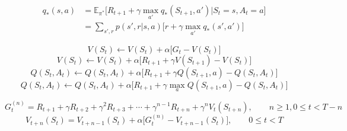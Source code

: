 \documentclass{article}
\begin{document}
\begin{align*}
  q_{\ast}(s,a) &= \mathbb{E}_{\pi^\ast}\bigl[R_{t+1} + \gamma \max_{a'} q_{\ast}(S_{t+1},a') \big| S_t=s, A_t=a \bigr]\\
  &= \sum_{s',r} p(s',r|s,a) \bigl[r+\gamma \max_{a'} q_{\ast}(s',a')\bigr]
\end{align*}

\vspace{10ex}
\begin{equation}
  \tag{6.1} V(S_t) \leftarrow V(S_t) + \alpha \bigl[G_t - V(S_t)\bigr]
\end{equation}
\begin{equation}
  \tag{6.2} V(S_t) \leftarrow V(S_t) + \alpha \bigl[ R_{t+1} + \gamma V(S_{t+1}) - V(S_t)]
\end{equation}
\begin{equation}
  \tag{6.5} Q(S_t,A_t) \leftarrow Q(S_t,A_t) + \alpha \bigl[ R_{t+1} + \gamma Q(S_{t+1},a) - Q(S_t, A_t) \bigr]
\end{equation}
\begin{equation}
  \tag{6.6} Q(S_t,A_t) \leftarrow Q(S_t,A_t) + \alpha \bigl[ R_{t+1} + \gamma \max_a Q(S_{t+1},a) - Q(S_t, A_t) \bigr]
\end{equation}

\begin{equation}
  \tag{7.1} G_t^{(n)} = R_{t+1} + \gamma R_{t+2} + \gamma^2 R_{t+3} + \cdots + \gamma^{n-1}R_{t+n} + \gamma^nV_t(S_{t+n}), \qquad n \geq 1, 0 \leq t < T-n
\end{equation}
\begin{equation}
  \tag{7.2} V_{t+n}(S_t) = V_{t+n-1}(S_t) + \alpha \bigl[G_t^{(n)} - V_{t+n-1}(S_t)\bigr],\qquad 0 \le t < T
\end{equation}
\end{document}
